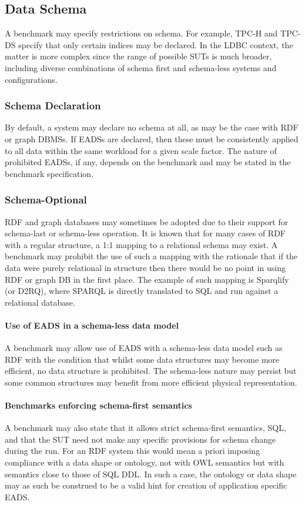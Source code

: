 \subsection{Data Schema}

A benchmark may specify restrictions on schema. For example, TPC-H and TPC-DS specify that only certain indices may be declared. In the LDBC context, the matter is more complex since the range of possible SUTs is much broader, including diverse combinations of schema first and schema-less systems and configurations.

\subsubsection{Schema Declaration}
By default, a system may declare no schema at all, as may be the case with RDF or graph DBMSs. If EADSs are declared, then these must be consistently applied to all data within the same workload for a given scale factor. The nature of prohibited EADSs, if any, depends on the benchmark and may be stated in the benchmark specification.

\subsubsection{Schema-Optional}

RDF and graph databases may sometimes be adopted due to their support for schema-last or schema-less operation. It is known that for many cases of RDF with a regular structure, a 1:1 mapping to a relational schema may exist. A benchmark may prohibit the use of such a mapping with the rationale that if the data were purely relational in structure then there would be no point in using RDF or graph DB in the first place. The example of such mapping is Sparqlify (or D2RQ), where SPARQL is directly translated to SQL and run against a relational database.

\paragraph{Use of EADS in a schema-less data model}
A benchmark may allow use of EADS with a schema-less data model such as RDF with the condition that whilst some data structures may become more efficient, no data structure is prohibited. The schema-less nature may persist but some common structures may benefit from more efficient physical representation.

\paragraph{Benchmarks enforcing schema-first semantics}
A benchmark may also state that it allows strict schema-first semantics, \eg SQL, and that the SUT need not make any specific provisions for schema change during the run. For an RDF system this would mean a priori imposing compliance with a data shape or ontology, not with OWL semantics but with semantics close to those of SQL DDL. In such a case, the ontology or data shape may as such be construed to be a valid hint for creation of application specific EADS.

